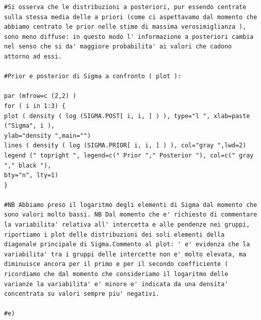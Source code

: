 \begin{lstlisting}[style=R]
#Si osserva che le distribuzioni a posteriori, pur essendo centrate sulla stessa media delle a priori (come ci aspettavamo dal momento che abbiamo centrato le prior nelle stime di massima verosimiglianza ), sono meno diffuse: in questo modo l' informazione a posteriori cambia nel senso che si da' maggiore probabilita' ai valori che cadono attorno ad essi.

#Prior e posterior di Sigma a confronto ( plot ):

par (mfrow=c (2,2) )
for ( i in 1:3) {
plot ( density ( log (SIGMA.POST[ i, i, ] ) ), type="l ", xlab=paste ("Sigma", i ),
ylab="density ",main="")
lines ( density ( log (SIGMA.PRIOR[ i, i, ] ) ), col="gray ",lwd=2)
legend (" topright ", legend=c(" Prior "," Posterior "), col=c(" gray "," black "),
bty="n", lty=1)
}

#NB Abbiamo preso il logaritmo degli elementi di Sigma dal momento che sono valori molto bassi. NB Dal momento che e' richiesto di commentare la variabilita' relativa all' intercetta e alle pendenze nei gruppi, riportiamo i plot delle distribuzioni dei soli elementi della diagonale principale di Sigma.Commento al plot: ' e' evidenza che la variabilita' tra i gruppi delle intercette non e' molto elevata, ma diminuisce ancora per il primo e per il secondo coefficiente ( ricordiamo che dal momento che consideriamo il logaritmo delle varianze la variabilita' e' minore e' indicata da una densita' concentrata su valori sempre piu' negativi.

#e)


\end{lstlisting}
